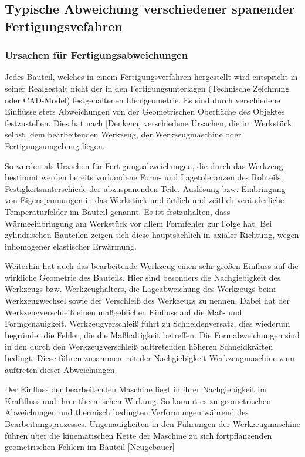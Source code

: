 \subsection{Typische Abweichung verschiedener spanender Fertigungsvefahren}

\subsubsection{Ursachen für Fertigungsabweichungen}

Jedes Bauteil, welches in einem Fertigungsverfahren hergestellt wird entspricht in seiner Realgestalt nicht der in den Fertigungsunterlagen (Technische Zeichnung oder CAD-Model) festgehaltenen Idealgeometrie. Es sind durch verschiedene Einflüsse stets Abweichungen von der Geometrischen Oberfläche des Objektes festzustellen. Dies hat nach [Denkena] verschiedene Ursachen, die im Werkstück selbst, dem bearbeitenden Werkzeug, der Werkzeugmaschine oder Fertigungsumgebung liegen. 

So werden als Ursachen für Fertigungsabweichungen, die durch das Werkzeug bestimmt werden bereits vorhandene Form- und Lagetoleranzen des Rohteils, Festigkeitsunterschiede der abzuspanenden Teile, Auslösung bzw. Einbringung von Eigenspannungen in das Werkstück und örtlich und zeitlich veränderliche Temperaturfelder im Bauteil genannt.
Es ist festzuhalten, dass Wärmeeinbringung am Werkstück vor allem Formfehler zur Folge hat. Bei zylindrischen Bauteilen zeigen sich diese hauptsächlich in axialer Richtung, wegen inhomogener elastischer Erwärmung.

Weiterhin hat auch das bearbeitende Werkzeug einen sehr großen Einfluss auf die wirkliche Geometrie des Bauteils. Hier sind besonders die Nachgiebigkeit des Werkzeugs bzw. Werkzeughalters, die Lageabweichung des Werkzeugs beim Werkzeugwechsel sowie der Verschleiß des Werkzeugs zu nennen. Dabei hat der Werkzeugverschleiß einen maßgeblichen Einfluss auf die Maß- und Formgenauigkeit. Werkzeugverschleiß führt zu Schneidenversatz, dies wiederum begründet die Fehler, die die Maßhaltigkeit betreffen. Die Formabweichungen sind in den durch den Werkzeugverschleiß auftretenden höheren Schneidkräften bedingt. Diese führen zusammen mit der Nachgiebigkeit Werkzeugmaschine zum auftreten dieser Abweichungen.

Der Einfluss der bearbeitenden Maschine liegt in ihrer Nachgiebigkeit im Kraftfluss und ihrer thermischen Wirkung. So kommt es zu geometrischen Abweichungen und thermisch bedingten Verformungen während des Bearbeitungsprozesses. Ungenauigkeiten in den Führungen der Werkzeugmaschine führen über die kinematischen Kette der Maschine zu sich fortpflanzenden geometrischen Fehlern im Bauteil [Neugebauer] 

